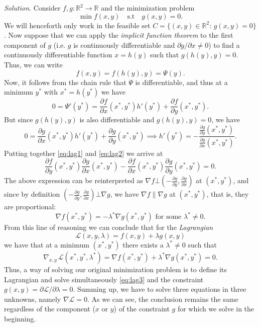 \documentclass[11pt]{article}
\begin{document}
\textit{Solution}. Consider $f,g:\mathbb R^2\to \mathbb R$ and the minimization problem
\[
\min f(x, y) \quad \text{s.t} \quad g(x,y)=0.
\]
We will henceforth only work in the feasible set $C=\{(x,y)\in \mathbb R^2: \, g(x,y)=0\}$. Now suppose that we can apply the \textit{implicit function theorem} to the first component of $g$ (i.e. $g$ is continuously differentiable and $\partial g/\partial x\neq 0$) to find a continuously differentiable function $x=h(y)$ such that $g(h(y), y)=0$. Thus, we can write
\[
f(x,y)=f(h(y), y) = \Psi(y).
\]
Now, it follows from the chain rule that $\Psi$ is differentiable, and thus at a minimum $y^*$ with $x^*=h(y^*)$ we have
\begin{equation}
  \label{eq:lag1}
0=\Psi'(y^*)= \frac{\partial f}{\partial x}(x^*, y^*)h'(y^*) + \frac{\partial f}{\partial y}(x^*, y^*).
\end{equation}
But since $g(h(y), y)$ is also differentiable and $g(h(y), y)=0$, we have
\begin{equation}
  \label{eq:lag2}
0=\frac{\partial g}{\partial x}(x^*,y^*)h'(y^*) + \frac{\partial g}{\partial y}(x^*, y^*) \implies h'(y^*) = - \dfrac{\frac{\partial g}{\partial y}(x^*, y^*)}{\frac{\partial g}{\partial x}(x^*, y^*)}.
\end{equation}
Putting together \eqref{eq:lag1} and \eqref{eq:lag2} we arrive at
\[
\frac{\partial f}{\partial y}(x^*, y^*)\frac{\partial g}{\partial x}(x^*, y^*) - \frac{\partial f}{\partial x}(x^*, y^*)\frac{\partial g}{\partial y}(x^*, y^*)=0.
\]
The above expression can be reinterpreted as $\nabla f \bot \left(-\frac{\partial g}{\partial y}, \frac{\partial g}{\partial x} \right)$ at $(x^*, y^*)$, and since by definition $\left(-\frac{\partial g}{\partial y}, \frac{\partial g}{\partial x} \right) \bot \nabla g$, we have $\nabla f \parallel \nabla g$ at $(x^*, y^*)$, that is, they are proportional:
\[
\nabla f(x^*, y^*)=-\lambda^* \nabla g(x^*, y^*) \text{ for some } \lambda^*\neq 0.
\]
From this line of reasoning we can conclude that for the \textit{Lagrangian}
\[
\mathcal L(x, y, \lambda)=f(x,y)+\lambda g(x,y)
\]
we have that at a minimum $(x^*, y^*)$ there exists a $\lambda^*\neq 0$ such that
\begin{equation}
  \label{eq:lag3}
\nabla_{x,y} \, \mathcal L(x^*, y^*, \lambda^*) = \nabla f(x^*, y^*) + \lambda^*\nabla g(x^*, y^*)=0.
\end{equation}
Thus, a way of solving our original minimization problem is to define its Lagrangian and solve simultaneously \eqref{eq:lag3} and the constraint $g(x,y)=\partial \mathcal L/\partial \lambda=0$. Summing up, we have to solve three equations in three unknowns, namely $\nabla \mathcal L=0$. As we can see, the conclusion remains the same regardless of the component ($x$ or $y$) of the constraint $g$ for which we solve in the beginning.
\end{document}
